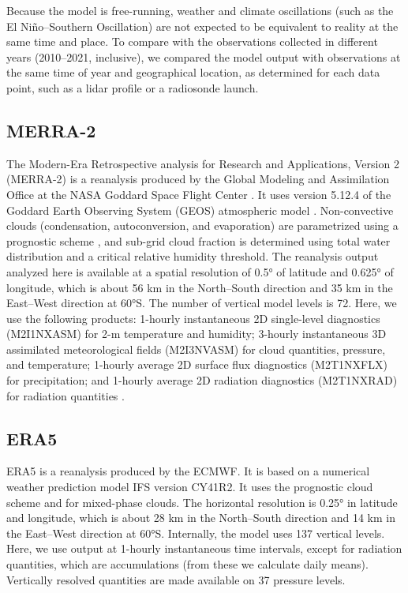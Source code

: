 \documentclass[draft]{agujournal2019}
\begin{document}
Because the model is free-running, weather and climate oscillations (such as the El Niño--Southern Oscillation) are not expected to be equivalent to reality at the same time and place. To compare with the observations collected in different years (2010--2021, inclusive), we compared the model output with observations at the same time of year and geographical location, as determined for each data point, such as a lidar profile or a radiosonde launch.

\subsection{MERRA-2}

The Modern-Era Retrospective analysis for Research and Applications, Version 2 (MERRA-2) is a reanalysis produced by the Global Modeling and Assimilation Office at the NASA Goddard Space Flight Center . It uses version 5.12.4 of the Goddard Earth Observing System (GEOS) atmospheric model . Non-convective clouds (condensation, autoconversion, and evaporation) are parametrized using a prognostic scheme , and sub-grid cloud fraction is determined using total water distribution and a critical relative humidity threshold. The reanalysis output analyzed here is available at a spatial resolution of 0.5° of latitude and 0.625° of longitude, which is about 56 km in the North--South direction and 35 km in the East--West direction at 60°S. The number of vertical model levels is 72. Here, we use the following products: 1-hourly instantaneous 2D single-level diagnostics (M2I1NXASM) for 2-m temperature and humidity; 3-hourly instantaneous 3D assimilated meteorological fields (M2I3NVASM) for cloud quantities, pressure, and temperature; 1-hourly average 2D surface flux diagnostics (M2T1NXFLX) for precipitation; and 1-hourly average 2D radiation diagnostics (M2T1NXRAD) for radiation quantities .

\subsection{ERA5}

ERA5  is a reanalysis produced by the ECMWF. It is based on a numerical weather prediction model IFS version CY41R2. It uses the  prognostic cloud scheme and  for mixed-phase clouds. The horizontal resolution is 0.25° in latitude and longitude, which is about 28 km in the North--South direction and 14 km in the East--West direction at 60°S. Internally, the model uses 137 vertical levels. Here, we use output at 1-hourly instantaneous time intervals, except for radiation quantities, which are accumulations (from these we calculate daily means). Vertically resolved quantities are made available on 37 pressure levels.
\end{document}
